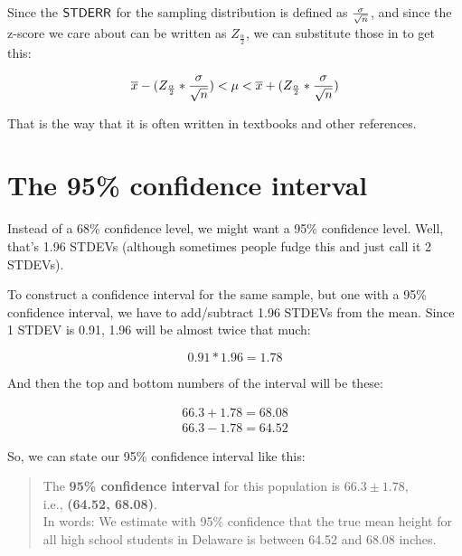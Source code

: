 \documentclass[../../../main.tex]{subfiles}
\begin{document}
Since the $\StdErr/$ for the sampling distribution is defined as $\frac{\populationstdev}{\sqrt{\samplesize/}}$, and since the z-score we care about can be written as $Z_{\frac{\alpha}{2}}$, we can substitute those in to get this:

\begin{equation*}
  \samplemean{x} - (Z_{\frac{\alpha}{2}} * \frac{\populationstdev}{\sqrt{\samplesize/}}) < \populationmean < \samplemean{x} + (Z_{\frac{\alpha}{2}} * \frac{\populationstdev}{\sqrt{\samplesize/}})
\end{equation*}

\noindent
That is the way that it is often written in textbooks and other references.


\section{The 95\% confidence interval}

Instead of a 68\% confidence level, we might want a 95\% confidence level. Well, that's 1.96 STDEVs (although sometimes people fudge this and just call it 2 STDEVs).

To construct a confidence interval for the same sample, but one with a 95\% confidence interval, we have to add/subtract 1.96 STDEVs from the mean. Since 1 STDEV is 0.91, 1.96 will be almost twice that much:

\begin{equation*}
  0.91 * 1.96 = 1.78  
\end{equation*}

\noindent
And then the top and bottom numbers of the interval will be these:

\begin{align*}
  66.3 + 1.78 = 68.08 \\
  66.3 - 1.78 = 64.52
\end{align*}

\noindent
So, we can state our 95\% confidence interval like this:

\begin{quote}
  The \textbf{95\% confidence interval} for this population is $\mathbf{66.3 \pm 1.78}$, \\
  i.e., \textbf{(64.52, 68.08)}. \\

  In words: We estimate with 95\% confidence that the true mean height for all high school students in Delaware is between 64.52 and 68.08 inches.
\end{quote}
\end{document}
